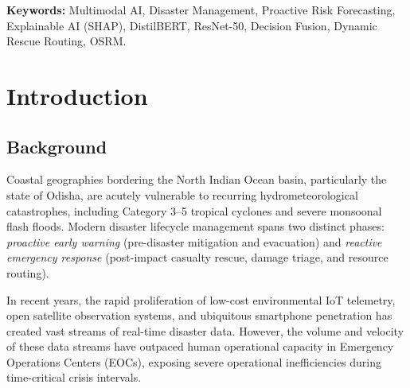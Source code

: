 \documentclass{article}
\begin{document}
\noindent\textbf{Keywords:} Multimodal AI, Disaster Management, Proactive Risk Forecasting, Explainable AI (SHAP), DistilBERT, ResNet-50, Decision Fusion, Dynamic Rescue Routing, OSRM.

\clearpage
\tableofcontents
\clearpage
\listoffigures
\listoftables
\clearpage
{}
\renewcommand{\thepage}{\arabic{page}}

\section{Introduction}
\subsection{Background}
Coastal geographies bordering the North Indian Ocean basin, particularly the state of Odisha, are acutely vulnerable to recurring hydrometeorological catastrophes, including Category 3–5 tropical cyclones and severe monsoonal flash floods. Modern disaster lifecycle management spans two distinct phases: \textit{proactive early warning} (pre-disaster mitigation and evacuation) and \textit{reactive emergency response} (post-impact casualty rescue, damage triage, and resource routing). 

In recent years, the rapid proliferation of low-cost environmental IoT telemetry, open satellite observation systems, and ubiquitous smartphone penetration has created vast streams of real-time disaster data. However, the volume and velocity of these data streams have outpaced human operational capacity in Emergency Operations Centers (EOCs), exposing severe operational inefficiencies during time-critical crisis intervals.
\end{document}
